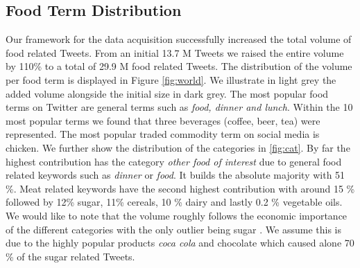 \subsection {Food Term Distribution}

Our framework for the data acquisition successfully increased the total volume of food related Tweets. From an initial 13.7 M Tweets we raised the entire volume by 110\% to a total of 29.9 M food related Tweets. The distribution of the volume per food term is displayed in Figure \ref{fig:world}. We illustrate in light grey the added volume alongside the initial size in dark grey. The most popular food terms on Twitter are general terms such as \emph{food, dinner and lunch}. Within the 10 most popular terms we found that three beverages (coffee, beer, tea) were represented. The most popular traded commodity term on social media is chicken.  We further show the distribution of the categories in \ref{fig:cat}. By far the highest contribution has the category \emph{other food of interest} due to general food related keywords such as \emph{dinner} or \emph{food}. It builds the absolute majority with 51 \%. Meat related keywords have the second highest contribution with around 15 \% followed by 12\% sugar, 11\%  cereals, 10 \% dairy  and lastly 0.2 \% vegetable oils. We would like to note that the volume roughly follows the economic importance of the different categories with the only outlier being sugar \cite{fao2008}. We assume this is due to the highly popular products \emph{coca cola} and {chocolate} which caused alone 70 \% of the sugar related Tweets. 



